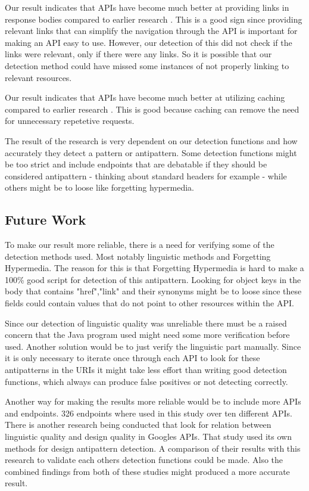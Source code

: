  
Our result indicates that APIs have become much better at providing links in response bodies compared to earlier research \cite{design}. This is a good sign since providing relevant links that can simplify the navigation through the API is important for making an API easy to use. However, our detection of this did not check if the links were relevant, only if there were any links. So it is possible that our detection method could have missed some instances of not properly linking to relevant resources.

 
Our result indicates that APIs have become much better at utilizing caching compared to earlier research \cite{design}. This is good because caching can remove the need for unnecessary repetetive requests. 

The result of the research is very dependent on our detection functions and how accurately they detect a pattern or antipattern. Some detection functions might be too strict and include endpoints that are debatable if they should be considered antipattern - thinking about standard headers for example - while others might be to loose like forgetting hypermedia.

\subsection{Future Work}
\label{futureWork}

To make our result more reliable, there is a need for verifying some of the detection methods used. Most notably linguistic methods and Forgetting Hypermedia. The reason for this is that Forgetting Hypermedia is hard to make a 100\% good script for detection of this antipattern. Looking for object keys in the body that contains "href","link" and their synonyms might be to loose since these fields could contain values that do not point to other resources within the API. 

 
Since our detection of linguistic quality was unreliable there must be a raised concern that the Java program used might need some more verification before used. Another solution would be to just verify the linguistic part manually. Since it is only necessary to iterate once through each API to look for these antipatterns in the URIs it might take less effort than writing good detection functions, which always can produce false positives or not detecting correctly.

Another way for making the results more reliable would be to include more APIs and endpoints. 326 endpoints where used in this study over ten different APIs. There is another research being conducted that look for relation between linguistic quality and design quality in Googles APIs. That study used its own methods for design antipattern detection. A comparison of their results with this research to validate each others detection functions could be made. Also the combined findings from both of these studies might produced a more accurate result.